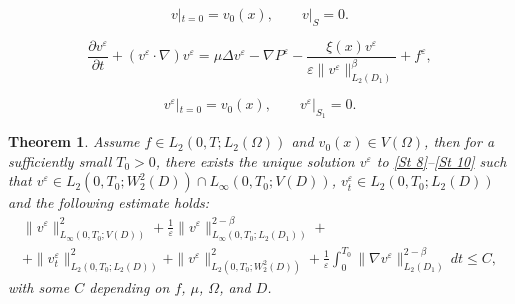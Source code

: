 \documentclass[10pt,a4paper]{amsart}
\newtheorem{theorem}{Theorem}
\begin{document}
\begin{equation} \label{St 3}
	v|_{t=0} = v_0(x),\qquad v|_{S} = 0.
\end{equation}

\begin{equation} \label{St 8}
	\frac{\partial v^\varepsilon}{\partial t} + (v^\varepsilon \cdot \nabla)v^\varepsilon = \mu\Delta v^\varepsilon - \nabla P^\varepsilon - \frac{\xi(x)v^\varepsilon}{\varepsilon\|v^\varepsilon\|_{L_2(D_1)}^{\beta}} + f^{\varepsilon},
\end{equation}

\begin{equation} \label{St 10}
	v^\varepsilon|_{t=0} = v_0(x),\qquad v^\varepsilon|_{S_1} = 0.
\end{equation}

\begin{theorem} Assume $f \in L_2(0, T; L_2(\Omega))$ and $v_0(x) \in V(\Omega)$, then for  a sufficiently small  $ T_0>0$, there exists the unique solution $ v^{\varepsilon}$ to \eqref{St 8}--\eqref{St 10} such that 
	$ v^{\varepsilon}\in L_2 (0,T_0; W^{2}_{2} (D))\cap L_\infty (0,T_0; V(D))$, $v^{\varepsilon}_{t}\in L_2 (0,T_0 ; L_2 (D))$ and   the following estimate holds: 
\begin{multline} \label{St 15}
\| v^{\varepsilon} \|^{2}_{L_\infty (0,T_0; V(D))} + \frac{1}{\varepsilon} \|v^{\varepsilon} \|^{2 - \beta}_{L_\infty (0,T_0; L_2 (D_1))} + \\
+ \|v^{\varepsilon}_{t} \|^{2}_{L_2 (0,T_0 ; L_2 (D))} 
+ \| v^{\varepsilon} \|^{2}_{L_2 (0,T_0; W^{2}_{2} (D))} 
+ \frac{1}{\varepsilon} \int_{0}^{T_0} \|\nabla v^{\varepsilon} \|^{2-\beta}_{L_2 (D_1)} \, dt 
\leq C,
\end{multline}
{with some $C$ depending on $f$, $\mu$, $\Omega$, and $D$.}
\end{theorem}
\end{document}
